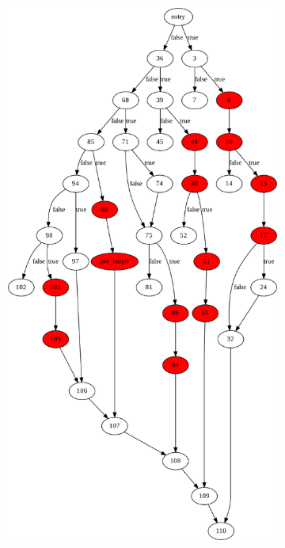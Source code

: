 \begin{figure}[htbp]
	\centering
	\begin{subfigure}[ht]{0.45\textwidth}
		\includegraphics[width=\textwidth]{inc/appendices/control_flow_analysis_example/step2_before.png}
	\end{subfigure}

\end{figure}
